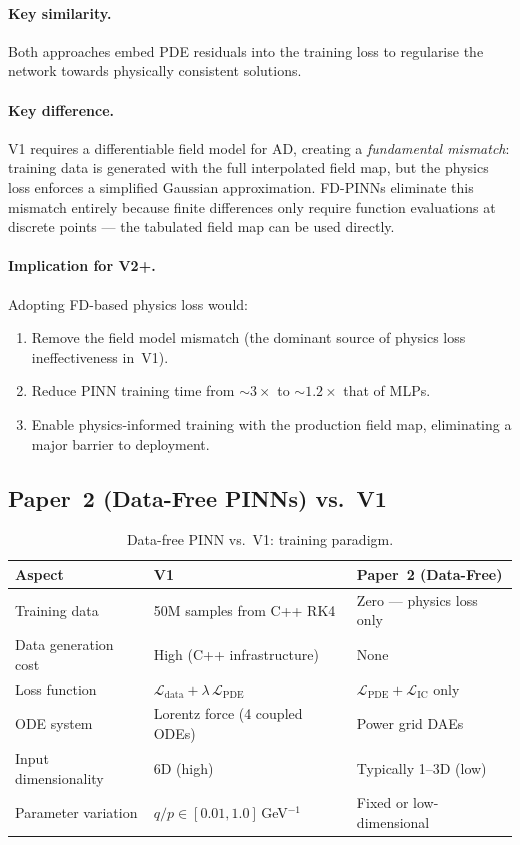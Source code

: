 \documentclass[12pt,a4paper]{article}
\begin{document}
\paragraph{Key similarity.} Both approaches embed PDE residuals into the training loss to regularise the network towards physically consistent solutions.

\paragraph{Key difference.} V1 requires a differentiable field model for AD, creating a \emph{fundamental mismatch}: training data is generated with the full interpolated field map, but the physics loss enforces a simplified Gaussian approximation. FD-PINNs eliminate this mismatch entirely because finite differences only require function evaluations at discrete points --- the tabulated field map can be used directly.

\paragraph{Implication for V2+.} Adopting FD-based physics loss would:
\begin{enumerate}
\item Remove the field model mismatch (the dominant source of physics loss ineffectiveness in~V1).
\item Reduce PINN training time from ${\sim}3\times$ to ${\sim}1.2\times$ that of MLPs.
\item Enable physics-informed training with the production field map, eliminating a major barrier to deployment.
\end{enumerate}

\subsection{Paper~2 (Data-Free PINNs) vs.\ V1}

\begin{table}[h]
\centering
\caption{Data-free PINN vs.\ V1: training paradigm.}
\label{tab:comp_datafree}
\begin{tabular}{p{4cm}p{5cm}p{5cm}}
\toprule
\textbf{Aspect} & \textbf{V1} & \textbf{Paper~2 (Data-Free)} \\
\midrule
Training data & 50M samples from C++ RK4 & Zero --- physics loss only \\
Data generation cost & High (C++ infrastructure) & None \\
Loss function & $\mathcal{L}_{\text{data}} + \lambda\,\mathcal{L}_{\text{PDE}}$ & $\mathcal{L}_{\text{PDE}} + \mathcal{L}_{\text{IC}}$ only \\
ODE system & Lorentz force (4 coupled ODEs) & Power grid DAEs \\
Input dimensionality & 6D (high) & Typically 1--3D (low) \\
Parameter variation & $q/p \in [0.01, 1.0]$\,GeV$^{-1}$ & Fixed or low-dimensional \\
\bottomrule
\end{tabular}
\end{table}
\end{document}

